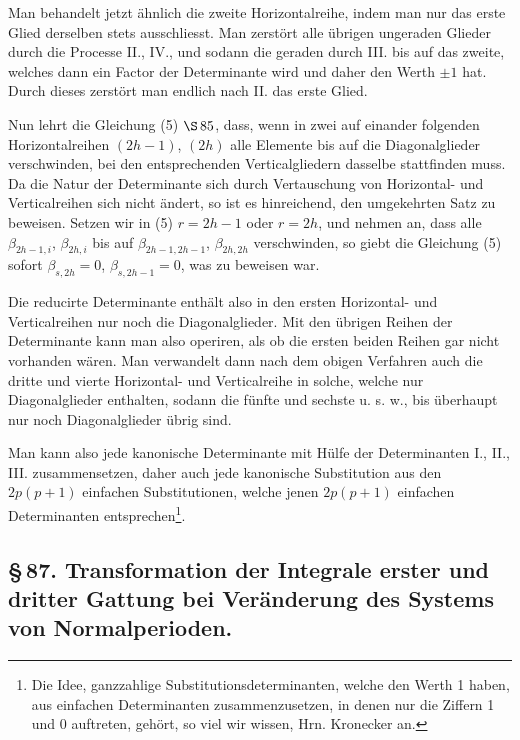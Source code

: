 \documentclass[10pt]{article}
\begin{document}
Man behandelt jetzt ähnlich die zweite Horizontalreihe, indem man nur das erste Glied derselben stets ausschliesst. Man zerstört alle übrigen ungeraden Glieder durch die Processe II., IV., und sodann die geraden durch III. bis auf das zweite, welches dann ein Factor der Determinante wird und daher den Werth \(\pm1\) hat. Durch dieses zerstört man endlich nach II. das erste Glied.

Nun lehrt die Gleichung (5) \(\S\,85\), dass, wenn in zwei auf einander folgenden Horizontalreihen \((2h-1)\), \((2h)\) alle Elemente bis auf die Diagonalglieder verschwinden, bei den entsprechenden Verticalgliedern dasselbe stattfinden muss. Da die Natur der Determinante sich durch Vertauschung von Horizontal- und Verticalreihen sich nicht ändert, so ist es hinreichend, den umgekehrten Satz zu beweisen. Setzen wir in (5) \(r=2h-1\) oder \(r=2h\), und nehmen an, dass alle \(\beta_{2h-1,i}\), \(\beta_{2h,i}\) bis auf \(\beta_{2h-1,2h-1}\), \(\beta_{2h,2h}\) verschwinden, so giebt die Gleichung (5) sofort \(\beta_{s,2h}=0\), \(\beta_{s,2h-1}=0\), was zu beweisen war.

Die reducirte Determinante enthält also in den ersten Horizontal- und Verticalreihen nur noch die Diagonalglieder. Mit den übrigen Reihen der Determinante kann man also operiren, als ob die ersten beiden Reihen gar nicht vorhanden wären. Man verwandelt dann nach dem obigen Verfahren auch die dritte und vierte Horizontal- und Verticalreihe in solche, welche nur Diagonalglieder enthalten, sodann die fünfte und sechste u. s. w., bis überhaupt nur noch Diagonalglieder übrig sind.

Man kann also jede kanonische Determinante mit Hülfe der Determinanten I., II., III. zusammensetzen, daher auch jede kanonische Substitution aus den \(2p(p+1)\) einfachen Substitutionen, welche jenen \(2p(p+1)\) einfachen Determinanten entsprechen\footnote{Die Idee, ganzzahlige Substitutionsdeterminanten, welche den Werth 1 haben, aus einfachen Determinanten zusammenzusetzen, in denen nur die Ziffern 1 und 0 auftreten, gehört, so viel wir wissen, Hrn. Kronecker an.}.

\subsection*{\S\,87. Transformation der Integrale erster und dritter Gattung bei Veränderung des Systems von Normalperioden.}
\end{document}

